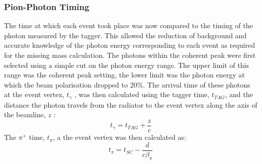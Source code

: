 \subsubsection{Pion-Photon Timing}
The time at which each event took place was now compared to the timing of the photon measured by the tagger. This allowed the reduction of background and accurate knowledge of the photon energy corresponding to each event as required for the missing mass calculation. The photons within the coherent peak were first selected using a simple cut on the photon energy range. The upper limit of this range was the coherent peak setting, the lower limit was the photon energy at which the beam polarisation dropped to 20\%. The arrival time of these photons at the event vertex, $t_\gamma$ , was then calculated using the tagger time, $t_{TAG}$, and the distance the photon travels from the radiator to the event vertex along the axis of the beamline, $z$ :
$$
t_\gamma = t_{TAG} + \frac{z}{c}
$$
The $\pi^+$ time, $t_\pi$, a the event vertex was then calculated as:
$$
t_\pi = t_{SC} - \frac{d}{c \beta_\pi}
$$
